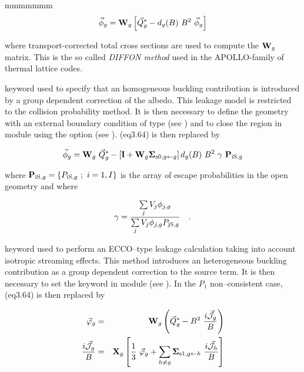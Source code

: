 \begin{ListeDeDescription}{mmmmmmm}
\begin{equation}
\vec\phi_g={\bf W}_g\left[ \vec Q^{*}_g-d_g(B) \ B^2 \ \vec\phi_g\right]
\label{eq:eq5.33}
\end{equation}

\noindent where transport-corrected total
cross sections are used to compute the ${\bf W}_g$ matrix. This is the so called
{\sl DIFFON method} used in the APOLLO-family of thermal lattice codes.

\item[\moc{ALBS}] keyword used to specify that an homogeneous buckling
contribution is introduced by a group dependent correction of the
albedo.\cite{ALSB2} This leakage model is restricted to the collision probability
method. It is then necessary to define the geometry with an
external boundary condition of type  (see ) and to close
the region in module  using the  option (see
). \eq(eq3.64) is then replaced by

\begin{equation}
\vec\phi_g={\bf W}_g \ \vec Q^{*}_g-\left[ {\bf I}+{\bf W}_g{\bf \Sigma}_{{\rm s0},g\gets g}\right] d_g(B) \ B^2 
\ \gamma \ {\bf P}_{{\rm iS},g}
\label{eq:eq5.34}
\end{equation}

\noindent where ${\bf P}_{{\rm iS},g}=\{P_{{\rm iS},g} \ ; \ i=1,I \}$ is the array of escape
probabilities in the open geometry and where

\begin{equation}
\gamma={\sum\limits_j V_j \phi_{j,g} \over \sum\limits_j V_j \phi_{j,g} P_{{\rm jS},g}} \ \ \ .
\label{eq:eq5.35}
\end{equation}

\item[\moc{ECCO}] keyword used to perform an ECCO--type leakage
calculation taking into account isotropic streaming effects. This method
introduces an heterogeneous buckling contribution as a group dependent correction
to the source term.\cite{ecco,rimpault} It is then necessary to set the keyword 
in module  (see ). In the $P_1$ non--consistent case,
\eq(eq3.64) is then replaced by

\vskip -0.3cm

\begin{eqnarray}
\vec\varphi_g&=& {\bf W}_g \left(\vec Q^{*}_g - B^2 \ {i\vec{\cal J}_g\over B}\right)
\label{eq:eq5.37flux} \\
{i\vec{\cal J}_g\over B} &=& {\bf X}_g \left[{1 \over 3}
\ \vec\varphi_g + \sum_{h\not= g} {\bf \Sigma}_{{\rm s1},g \gets h} \
{i\vec{\cal J}_h\over B} \right]
\label{eq:eq5.37cour}
\end{eqnarray}


\end{ListeDeDescription}
